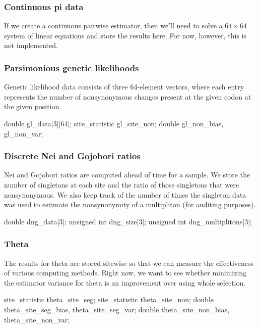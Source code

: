 \documentclass{article}
\begin{document}
      \subsubsection{Continuous pi data}

	If we create a continuous pairwise estimator, then we'll need to solve a
	$64 \times 64$ system of linear equations and store the results here.
	For now, however, this is not implemented.

      \subsubsection{Parsimonious genetic likelihoods}

	Genetic likelihood data consists of three 64-element vectors, where each
	entry represents the number of nonsynonymous changes present at the
	given codon at the given position.

\begin{ccode}
  double		gl_data[3][64];
  site_statistic	gl_site_non;
  double		gl_non_bias, gl_non_var;
\end{ccode}

      \subsubsection{Discrete Nei and Gojobori ratios}

	Nei and Gojobori ratios are computed ahead of time for a sample. We
	store the number of singletons at each site and the ratio of those
	singletons that were nonsynonymous. We also keep track of the number of
	times the singleton data was used to estimate the nonsynonymity of a
	multipliton (for auditing purposes).

\begin{ccode}
  double		dng_data[3];
  unsigned int		dng_size[3];
  unsigned int		dng_multiplitons[3];
\end{ccode}

      \subsubsection{Theta}

	The results for theta are stored sitewise so that we can measure the
	effectiveness of various computing methods. Right now, we want to see
	whether minimizing the estimator variance for theta is an improvement
	over using whole selection.

\begin{ccode}
  site_statistic	theta_site_seg;
  site_statistic	theta_site_non;
  double		theta_site_seg_bias, theta_site_seg_var;
  double		theta_site_non_bias, theta_site_non_var;
\end{ccode}
\end{document}
